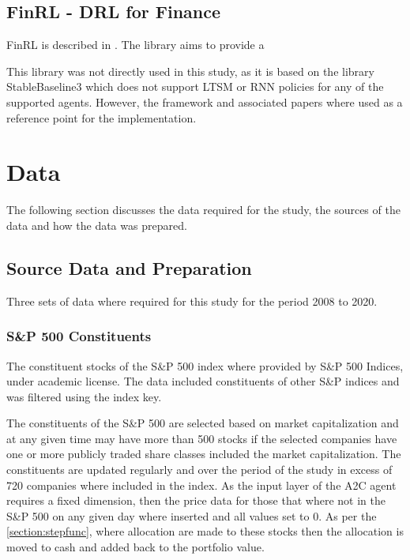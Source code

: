 \documentclass[oneside,12pt]{Classes/RoboticsLaTeX}
\begin{document}
\section{FinRL - DRL for Finance}
FinRL is described in \citet{finrl2020}. The library aims to provide a  \citet[p.2]{finrl2020}

This library was not directly used in this study, as it is based on the library StableBaseline3 \citep{stable-baselines3} which does not support LTSM or RNN policies for any of the supported agents. However, the framework and associated papers where used as a reference point for the implementation.         

\chapter{Data}
\label{chap:data}
The following section discusses the data required for the study, the sources of the data and how the data was prepared.
\section{Source Data and Preparation}
Three sets of data where required for this study for the period 2008 to 2020.
\subsection{S\&P 500 Constituents}
The constituent stocks  of the S\&P 500 index where provided by S\&P 500 Indices, under academic license. The data included constituents of other S\&P indices and was filtered using the index key.

The constituents of the S\&P 500 are selected based on market capitalization and at any given time may have more than 500 stocks if the selected companies have one or more publicly traded share classes included the market capitalization.  The constituents are updated regularly and over the period of the study in excess of 720 companies where included in the index.  As the input layer of the A2C agent requires a fixed dimension, then the price data for those  that where not in the S\&P 500 on any given day where inserted and all values set to 0. As per the \ref{section:stepfunc}, where allocation are made to these stocks then the allocation is moved to cash and added back to the portfolio value.
\end{document}

